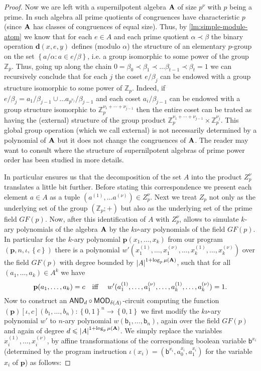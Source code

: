 \documentclass[11pt,a4paper]{amsart}
\newcommand{\m}[1]{{\uppercase {\bf{#1}}}}
\newcommand{\set}[1]{{\left\{ {#1} \right\} }}
\newcommand{\card}[1]{\left| #1 \right|}
\renewcommand{\leq}{\leqslant}
\newcommand{\po}[1]{{\mathbf {#1}}}
\newcommand{\map}{\longrightarrow}
\newcommand{\z}{\mathbb{Z}}
\newcommand{\progg}[4]{\left(#1,#2,#3,#4\right)}
\newcommand{\progb}[3]{\left(#1\right)\!\left[#2,#3\right]}
\renewcommand{\b}{\textsf{b}}
\newcommand{\true}{1}
\newcommand{\false}{0}
\newcommand{\bool}{\set{\false,\true}}
\newcommand{\zero}{e}
\newcommand{\ccc}{c}    \newcommand{\s}{s}
\newcommand{\ccand}{\mathsf{AND}}
\newcommand{\ccmod}{\mathsf{MOD}}
\newcommand{\pdiv}[1]{\ppdiv\left(#1\right)}    \newcommand{\ar}[1]{\mu\left({#1}\right)}       \newcommand{\maxar}[1]{\mu\left({\m #1}\right)}
\begin{document}
\begin{proof}
Now we are left with a supernilpotent algebra $\m A$ of size $p^\nu$ with $p$ being a prime.
In such algebra all prime quotients of congruences have characteristic $p$ (since $\m A$ has classes of congruences of equal size).
Thus, by \cref{lm:simple-module-atom} we know that for each $\zero\in A$
and each prime quotient $\alpha\prec\beta$
the binary operation $\po d(x,\zero,y)$ defines (modulo $\alpha$) the structure of an elementary $p$-group on the set $\set{a/\alpha : a\in\zero/\beta}$, i.e. a group isomorphic to some power of the group $\z_p$.
Thus, going up along the chain
$0=\beta_0 \prec \beta_1 \prec \ldots \beta_{t-1} \prec \beta_t=1$
we can recursively conclude that for each  $j$ the coset $\zero/\beta_j$ can be endowed with a group structure isomorphic to some power of $\z_p$.
Indeed, if $\zero/\beta_j=a_1/\beta_{j-1}\cup\ldots a_{p^{\nu_j}}/\beta_{j-1}$
and each coset $a_i/\beta_{j-1}$ can be endowed with a group structure isomorphic to
$\z_p^{\nu_1+\cdots+\nu_{j-1}}$ then the entire coset can be trated as having the (external) structure of the group product $\z_p^{\nu_1+\cdots+\nu_{j-1}}\times\z_p^{\nu_j}$.
This global group operation (which we call external)
is not necessarily determined by a polynomial of $\m A$
but it does not change the congruences of $\m A$.
The reader may want to consult \cite{aichinger-spectrum, KawalekK}
where the structure of supernilpotent algebras of prime power order has been studied in more details.

In particular \cite{KawalekK} ensures us that the decomposition of the set $A$ into the product $Z_p^\nu$ translates a little bit further.
Before stating this correspondence we present each element $a\in A$ as a tuple
$(a^{(1)},\ldots a^{(\nu)}) \in Z_p^\nu$.
Next we treat $Z_p$ not only as the underlying set of the group $(\z_p;+)$
but also as the underlying set of the prime field $GF(p)$.
Now, after this identification of $A$ with $Z_p^\nu$,
\cite[Lemma 3.2]{KawalekK} allows to simulate $k$-ary polynomials of the algebra $\m A$
by the $k\nu$-ary polynomials of the field $GF(p)$.
In particular for the $k$-ary polynomial $\po p(x_1,\ldots,x_k)$
from our program $\progg{\po p}{n}{\iota}{\set{c}}$ there is a polynomial
$w'(x_1^{(1)},\ldots,x_1^{(\nu)},\ldots,x_k^{(1)},\ldots,x_k^{(\nu)})$
over the field $GF(p)$ with degree bounded by $\card{A}^{1+\log_p\maxar A}$,
such that for all $(a_1,\ldots,a_k)\in A^k$ we have
\[
\po p(a_1,\ldots,a_k)=c
\mbox{\quad iff \quad }
w'(a_1^{(1)},\ldots,a_1^{(\nu)},\ldots,a_k^{(1)},\ldots,a_k^{(\nu)})=1.
\]
Now to construct an $\ccand_d\circ\ccmod_{\pdiv A}$-circuit computing
the function
$\progb{\po p}{\iota}{\ccc}(b_1,\ldots,b_n):\bool^n \map \bool$
we first modify the $k\nu$-ary polynomial
$w'$ to $n$-ary polynomial $w(\b_1,\ldots,\b_n)$,
again over the field $GF(p)$ and again of degree $d \leq \card{A}^{1+\log_p\maxar A}$.
We simply replace the variables $x_i^{(1)},\ldots,x_i^{(\nu)}$,
by affine transformations of the corresponding boolean variable $\b^{x_i}$
(determined by the program instruction $\iota(x_i)=(\b^{x_i},a_0^{x_i}, a_1^{x_i})$
for the variable $x_i$ of $\po p$) as follows:


\end{proof}
\end{document}
